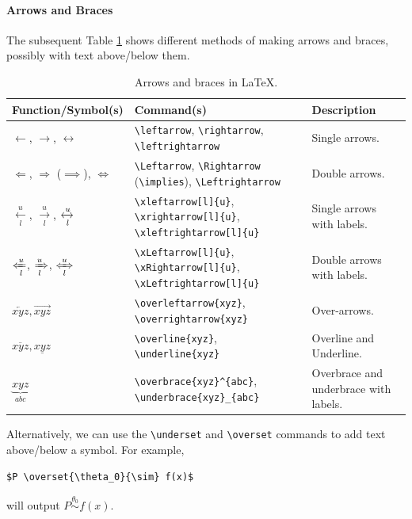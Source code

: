 \paragraph{Arrows and Braces} The subsequent Table \ref{tab:arrowbrace} shows different methods of making arrows and braces, possibly with text above/below them.

\begin{table}[ht!]
\begin{tabularx}{\textwidth}{|p{}|>{\raggedright}p{}|X|}
\hline
Function/Symbol(s) & Command(s) & Description \\
\hline
$\leftarrow$, $\rightarrow$, $\leftrightarrow$ & \texttt{\textbackslash leftarrow}, \texttt{\textbackslash rightarrow}, \texttt{\textbackslash leftrightarrow} & Single arrows. \\
\hline
$\Leftarrow$, $\Rightarrow$ ($\implies$), $\Leftrightarrow$ & \texttt{\textbackslash Leftarrow}, \texttt{\textbackslash Rightarrow} (\texttt{\textbackslash implies}), \texttt{\textbackslash Leftrightarrow} & Double arrows. \\
\hline
$\xleftarrow[l]{u}$, $\xrightarrow[l]{u}$, $\xleftrightarrow[l]{u}$ & \texttt{\textbackslash xleftarrow[l]\{u\}}, \texttt{\textbackslash xrightarrow[l]\{u\}}, \texttt{\textbackslash xleftrightarrow[l]\{u\}} & Single arrows with labels. \\
\hline
$\xLeftarrow[l]{u}$, $\xRightarrow[l]{u}$, $\xLeftrightarrow[l]{u}$ & \texttt{\textbackslash xLeftarrow[l]\{u\}}, \texttt{\textbackslash xRightarrow[l]\{u\}}, \texttt{\textbackslash xLeftrightarrow[l]\{u\}} & Double arrows with labels. \\
\hline
$\overleftarrow{xyz}, \overrightarrow{xyz}$ & \texttt{\textbackslash overleftarrow\{xyz\}}, \texttt{\textbackslash overrightarrow\{xyz\}} & Over-arrows. \\
\hline
$\overline{xyz}, \underline{xyz}$ & \texttt{\textbackslash overline\{xyz\}}, \texttt{\textbackslash underline\{xyz\}} & Overline and Underline. \\
\hline
\raisebox{-10pt}{\smash{$\overbrace{xyz}^{abc}$},} $\underbrace{xyz}_{abc}$ & \texttt{\textbackslash overbrace\{xyz\}\^{}\{abc\}}, \texttt{\textbackslash underbrace\{xyz\}\_\{abc\}} & Overbrace and underbrace with labels. \\
\hline
\end{tabularx}
\caption{Arrows and braces in \LaTeX{}.}
\label{tab:arrowbrace}
\end{table}
Alternatively, we can use the \texttt{\textbackslash underset} and \texttt{\textbackslash overset} commands to add text above/below a symbol. For example,
\begin{lstlisting}
$P \overset{\theta_0}{\sim} f(x)$
\end{lstlisting}
will output $P \overset{\theta_0}{\sim} f(x)$.

